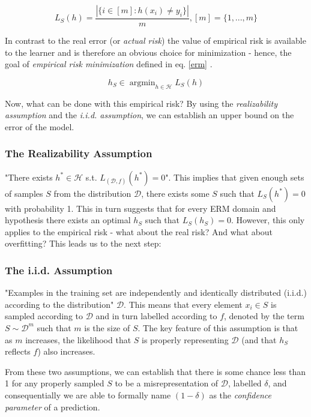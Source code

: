 \documentclass[10pt,conference]{IEEEtran}
\def\dist{\mathcal{D}}
\def\hypspace{\mathcal{H}}
\DeclareMathOperator*{\argmin}{argmin}
\begin{document}
  \begin{equation}
    \label{trainingerror}
    L_S(h) = \frac{|\{i \in [m] : h(x_i) \neq y_i\}|}{m}, [m] = \{1, ..., m\}
  \end{equation}

  In contrast to the real error (or \emph{actual risk}) the value of empirical risk is available to the learner and is therefore an obvious choice for minimization - hence, the goal of \emph{empirical risk minimization} defined in eq. \ref{erm} \cite{shais}.

  \begin{equation}
    \label{erm}
    h_S \in \argmin_{h \in \hypspace} L_S(h)
  \end{equation}

  Now, what can be done with this empirical risk? By using the \emph{realizability assumption} and the \emph{i.i.d. assumption}, we can establish an upper bound on the error of the model.

  \subsubsection{\textbf{The Realizability Assumption}} 
    "There exists $h^* \in \hypspace$ s.t. $L_{(\dist, f)}(h^*) = 0$"\cite{shais}. This implies that given enough sets of samples $S$ from the distribution $\dist$, there exists some $S$ such that $L_S(h^*) = 0$ with probability 1. This in turn suggests that for every ERM domain and hypothesis there exists an optimal $h_S$ such that $L_S(h_S) = 0$. However, this only applies to the empirical risk - what about the real risk? And what about overfitting? This leads us to the next step:
  \subsubsection{\textbf{The i.i.d. Assumption}} 
    "Examples in the training set are independently and identically distributed (i.i.d.) according to the distribution" $\dist$\cite{shais}. This means that every element $x_i \in S$ is sampled according to $\dist$ and in turn labelled according to $f$, denoted by the term $S \sim \dist^m$ such that $m$ is the size of $S$\cite{shais}. The key feature of this assumption is that as $m$ increases, the likelihood that $S$ is properly representing $\dist$ (and that $h_S$ reflects $f$) also increases\cite{shais}.
  
    From these two assumptions, we can establish that there is some chance less than 1 for any properly sampled $S$ to be a misrepresentation of $\dist$, labelled $\delta$, and consequentially we are able to formally name $(1-\delta)$ as the \emph{confidence parameter} of a prediction\cite{shais}.
\end{document}
